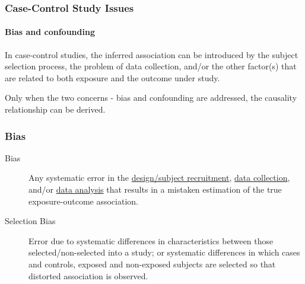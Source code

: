 \documentclass[table,10pt]{beamer}
\begin{document}
\begin{CJK*}{UTF8}{gbsn}
\begin{frame}[t]
\frametitle{Case-Control Study Issues}
\framesubtitle{Bias and confounding}
In case-control studies, the inferred association can be introduced by the 
subject selection process, the problem of data collection, and/or the other 
factor(s) that are related to both exposure and the outcome under study.

Only when the two concerns - \alert{bias and confounding} are addressed, the 
causality relationship can be derived.
\end{frame}


\begin{frame}[t]
\frametitle{Bias}
\begin{description}
	\item[Bias]{Any systematic error in the \underline{design/subject recruitment}, 
		\underline{data collection}, and/or \underline{data analysis} that 
		results in a mistaken estimation of the true exposure-outcome association.}
	\item[Selection Bias]{Error due to systematic differences in characteristics 
		between those selected/non-selected into a study; or systematic differences 
		in which cases and controls, exposed and non-exposed subjects are selected 
		so that distorted association is observed.}
\end{description}
\end{frame}


\end{CJK*}
\end{document}
